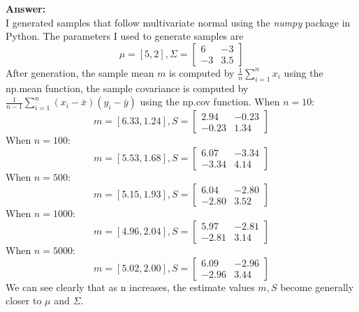 \documentclass{article}
\begin{document}
\begin{enumerate}
    \textbf{Answer:} \\
    I generated samples that follow multivariate normal using the \emph{numpy} package in Python. 
    The parameters I used to generate samples are 
    $$
    \mu=[5, 2], \Sigma=
    \left[\begin{array}{ll}
    6 & -3 \\
    -3 & 3.5
    \end{array}\right]
    $$
    After generation, the sample mean $m$ is computed by $\frac{1}{n}\sum^n_{i=1} x_i$ using the np.mean function, the sample covariance is computed by $\frac{1}{n-1}\sum_{i=1}^n (x_i-\bar x)(y_i-\bar y)$ using the np.cov function. 
    When $n=10$:\\
    $$
    m = [6.33, 1.24], S = 
    \left[\begin{array}{ll}
        2.94 & -0.23 \\
        -0.23 & 1.34
        \end{array}\right]
    $$
    When $n=100$:\\
    $$
    m = [5.53, 1.68], S = 
    \left[\begin{array}{ll}
        6.07 & -3.34 \\
        -3.34 & 4.14
        \end{array}\right]
    $$
    When $n=500$:\\
    $$
    m = [5.15, 1.93], S = 
    \left[\begin{array}{ll}
        6.04 & -2.80 \\
        -2.80 & 3.52
        \end{array}\right]
    $$
    When $n=1000$:\\
    $$
    m = [4.96, 2.04], S = 
    \left[\begin{array}{ll}
        5.97 & -2.81 \\
        -2.81 & 3.14
        \end{array}\right]
    $$
    When $n=5000$:\\
    $$
    m = [5.02, 2.00], S = 
    \left[\begin{array}{ll}
        6.09 & -2.96 \\
        -2.96 & 3.44
        \end{array}\right]
    $$
    We can see clearly that as n increases, the estimate values $m, S$ become generally closer to $\mu$ and $\Sigma$.


\end{enumerate}
\end{document}

